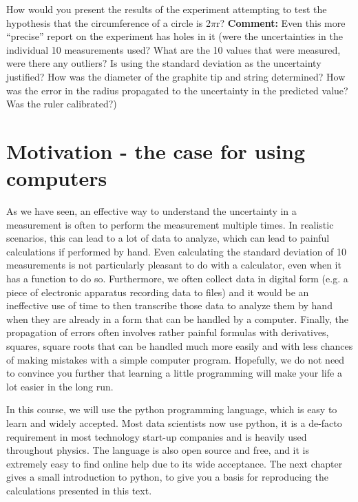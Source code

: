 \begin{example}{0pt}{How would you present the results of the experiment attempting to test the hypothesis that the circumference of a circle is 2$\pi$r?}{}
\textbf{Comment:} Even this more ``precise'' report on the experiment has holes in it (were the uncertainties in the individual 10 measurements used? What are the 10 values that were measured, were there any outliers? Is using the standard deviation as the uncertainty justified? How was the diameter of the graphite tip and string determined? How was the error in the radius propagated to the uncertainty in the predicted value? Was the ruler calibrated?)
\end{example}


\section{Motivation - the case for using computers}
As we have seen, an effective way to understand the uncertainty in a measurement is often to perform the measurement multiple times. In realistic scenarios, this can lead to a lot of data to analyze, which can lead to painful calculations if performed by hand. Even calculating the standard deviation of 10 measurements is not particularly pleasant to do with a calculator, even when it has a function to do so. Furthermore, we often collect data in digital form (e.g. a piece of electronic apparatus recording data to files) and it would be an ineffective use of time to then transcribe those data to analyze them by hand when they are already in a form that can be handled by a computer. Finally, the propagation of errors often involves rather painful formulas with derivatives, squares, square roots that can be handled much more easily and with less chances of making mistakes with a simple computer program. Hopefully, we do not need to convince you further that learning a little programming will make your life a lot easier in the long run.

In this course, we will use the python programming language, which is easy to learn and widely accepted. Most data scientists now use python, it is a de-facto requirement in most technology start-up companies and is heavily used throughout physics. The language is also open source and free, and it is extremely easy to find online help due to its wide acceptance. The next chapter gives a small introduction to python, to give you a basis for reproducing the calculations presented in this text.


